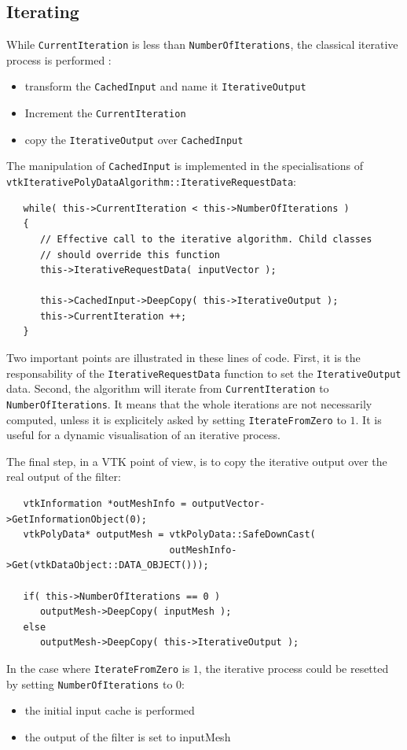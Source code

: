 \documentclass{InsightArticle}
\begin{document}
\subsection{Iterating}
%
While \verb!CurrentIteration! is less than \verb!NumberOfIterations!, the 
classical iterative process is performed :
\begin{itemize}
 \item transform the \verb!CachedInput! and name it \verb!IterativeOutput!
 \item Increment the \verb!CurrentIteration!
 \item copy the \verb!IterativeOutput! over \verb!CachedInput!
\end{itemize}
%
The manipulation of \verb!CachedInput! is implemented in the specialisations of 
\verb!vtkIterativePolyDataAlgorithm::IterativeRequestData!:
%
\begin{verbatim}
   while( this->CurrentIteration < this->NumberOfIterations )
   {
      // Effective call to the iterative algorithm. Child classes
      // should override this function
      this->IterativeRequestData( inputVector ); 

      this->CachedInput->DeepCopy( this->IterativeOutput );
      this->CurrentIteration ++;      
   }     
\end{verbatim}
%
Two important points are illustrated in these lines of code. First, it is the 
responsability of the \verb!IterativeRequestData! function to set the
\verb!IterativeOutput! data. Second, the algorithm will iterate from 
\verb!CurrentIteration! to \verb!NumberOfIterations!. It means that the whole
iterations are not necessarily computed, unless it is explicitely asked by 
setting \verb!IterateFromZero! to $1$. It is useful for a dynamic visualisation
of an iterative process.

The final step, in a VTK point of view, is to copy the iterative output over
the real output of the filter:
%
\begin{verbatim}
   vtkInformation *outMeshInfo = outputVector->GetInformationObject(0);
   vtkPolyData* outputMesh = vtkPolyData::SafeDownCast(
                             outMeshInfo->Get(vtkDataObject::DATA_OBJECT()));

   if( this->NumberOfIterations == 0 )
      outputMesh->DeepCopy( inputMesh );
   else
      outputMesh->DeepCopy( this->IterativeOutput );  
\end{verbatim}
%
In the case where \verb!IterateFromZero! is $1$, the iterative process could be 
resetted by setting \verb!NumberOfIterations! to 0:
\begin{itemize}
 \item the initial input cache is performed
 \item the output of the filter is set to inputMesh
\end{itemize}
%
\end{document}
